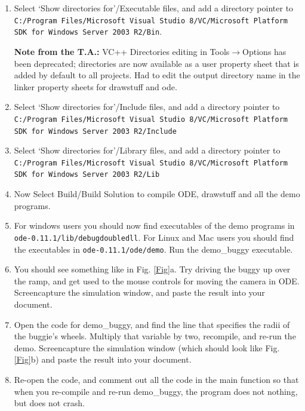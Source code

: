 \documentclass[12pt]{article}
\begin{document}
\begin{enumerate}
\item Select `Show directories for'/Executable files, and add a directory pointer to \\
\texttt{C:/Program Files/Microsoft Visual Studio 8/VC/Microsoft Platform SDK for Windows Server 2003 R2/Bin}.

\textbf{Note from the T.A.:} VC++ Directories editing in Tools$\rightarrow$Options has been deprecated; directories are now available as a user property sheet that is added by default to all projects. Had to edit the output directory name in the linker property sheets for drawstuff and ode.

\item Select `Show directories for'/Include files, and add a directory pointer to \\
\texttt{C:/Program Files/Microsoft Visual Studio 8/VC/Microsoft Platform SDK for Windows Server 2003 R2/Include}

\item Select `Show directories for'/Library files, and add a directory pointer to \\
\texttt{C:/Program Files/Microsoft Visual Studio 8/VC/Microsoft Platform SDK for Windows Server 2003 R2/Lib}

\item Now Select Build/Build Solution to compile ODE, drawstuff and all the demo programs.

\item For windows users you should now find executables of the demo programs in \\ \texttt{ode-0.11.1/lib/debugdoubledll}. For Linux and Mac users you should find the executables in \texttt{ode-0.11.1/ode/demo}. Run the demo\_buggy executable.

\item You should see something like in Fig. \ref{Fig}a. Try driving the buggy up over the ramp, and get used to the mouse controls for moving the camera in ODE. Screencapture the simulation window, and paste the result into your document.

\item Open the code for demo\_buggy, and find the line that specifies the radii of the buggie's wheels. Multiply that variable by two, recompile, and re-run the demo. Screencapture the simulation window  (which should look like Fig. \ref{Fig}b) and paste the result into your document.

\item Re-open the code, and comment out all the code in the main function so that when you re-compile and re-run demo\_buggy, the program does not nothing, but does not crash.


\end{enumerate}
\end{document}
